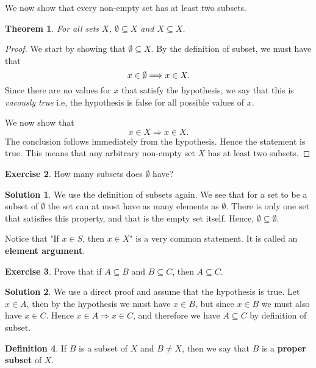 \documentclass[a4paper, 11pt]{report}
\theoremstyle{plain}
\newtheorem{thm}{Theorem}[section]
\theoremstyle{definition}
\newtheorem{defn}[thm]{Definition}
\newtheorem{exrc}[thm]{Exercise}
\newtheorem*{sltn}{Solution}
\newcommand{\impl}{\Longrightarrow}
\begin{document}
We now show that every non-empty set has at least two subsets.
\begin{thm}
For all sets $X$, $\emptyset \subseteq X$ and $X \subseteq X$.
\end{thm}
\begin{proof}
  We start by showing that $\emptyset \subseteq X$. By the definition of
  subset, we must have that 
  \begin{equation}
    \notag
    x \in \emptyset \impl x \in X.
  \end{equation}
  Since there are no values for $x$ that satisfy the hypothesis, we say that
  this is \textit{vacously true} i.e, the hypothesis is false for all possible
  values of $x$.

  We now show that 
  \begin{equation}
    x \in X \impl x \in X.
  \end{equation} 
  The conclusion follows immediately from the hypothesis. Hence the statement
  is true.  This means that any arbitrary non-empty set $X$ has at least two
  subsets.
\end{proof}

\begin{exrc}
  How many subsets does $\emptyset$ have?
\end{exrc}
\begin{sltn}
  We use the definition of subsets again. We see that for a set to be a subset
  of $\emptyset$ the set can at most have as many elements as $\emptyset$.
  There is only one set that satisfies this property, and that is the empty set
  itself. Hence, $\emptyset \subseteq \emptyset$. 
\end{sltn}

Notice that "If $x \in S$, then $x \in X$" is a very common statement. It is
called an \textbf{element argument}.

\begin{exrc}
  Prove that if $A \subseteq B$ and $B \subseteq C$, then $A \subseteq C$.
\end{exrc}
\begin{sltn}
  We use a direct proof and assume that the hypothesis is true.  Let $x \in A$,
  then by the hypothesis we must have $x \in B$, but since $x \in B$ we must
  also have $x \in C$. Hence $x \in A \impl x \in C$, and therefore we have $A
  \subseteq C$ by definition of subset.
\end{sltn}

\begin{defn}
  If $B$ is a subset of $X$ and $B \neq X$, then we say that $B$ is a
  \textbf{proper subset} of $X$.
\end{defn}
\end{document}
